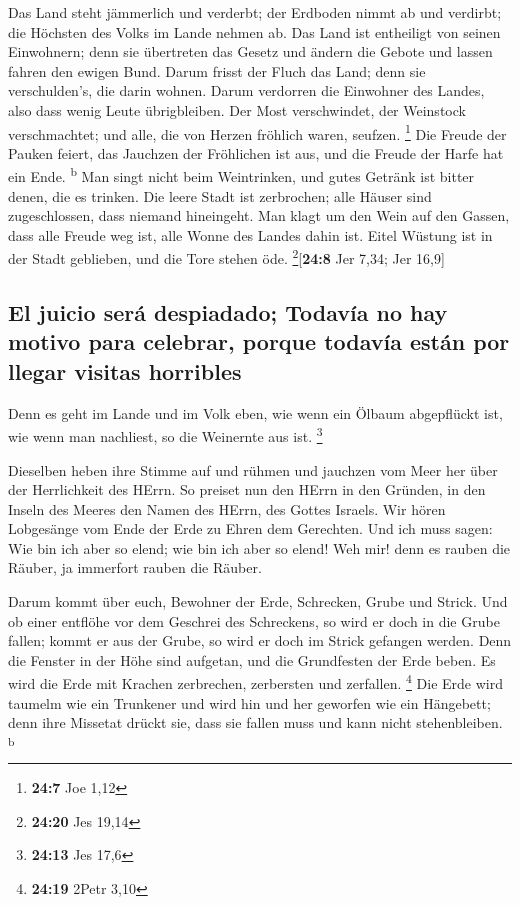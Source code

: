  Das Land steht jämmerlich und verderbt; der Erdboden
nimmt ab und verdirbt; die Höchsten des Volks im Lande nehmen ab.
 Das Land ist entheiligt von seinen Einwohnern; denn sie
übertreten das Gesetz und ändern die Gebote und lassen fahren den ewigen
Bund.  Darum frisst der Fluch das Land; denn sie
verschulden's, die darin wohnen. Darum verdorren die Einwohner des
Landes, also dass wenig Leute übrigbleiben.  Der Most
verschwindet, der Weinstock verschmachtet; und alle, die von Herzen
fröhlich waren, seufzen. \footnote{\textbf{24:7} Joe 1,12}
 Die Freude der Pauken feiert, das Jauchzen der Fröhlichen
ist aus, und die Freude der Harfe hat ein Ende. \textsuperscript{b}
 Man singt nicht beim Weintrinken, und gutes Getränk ist
bitter denen, die es trinken.  Die leere Stadt ist
zerbrochen; alle Häuser sind zugeschlossen, dass niemand hineingeht.
 Man klagt um den Wein auf den Gassen, dass alle Freude
weg ist, alle Wonne des Landes dahin ist.  Eitel Wüstung
ist in der Stadt geblieben, und die Tore stehen öde.
\footnote{\textbf{24:20} Jes 19,14}{[}\textbf{24:8} Jer 7,34; Jer
16,9{]}

\hypertarget{el-juicio-seruxe1-despiadado-todavuxeda-no-hay-motivo-para-celebrar-porque-todavuxeda-estuxe1n-por-llegar-visitas-horribles}{%
\subsection{El juicio será despiadado; Todavía no hay motivo para
celebrar, porque todavía están por llegar visitas
horribles}\label{el-juicio-seruxe1-despiadado-todavuxeda-no-hay-motivo-para-celebrar-porque-todavuxeda-estuxe1n-por-llegar-visitas-horribles}}

 Denn es geht im Lande und im Volk eben, wie wenn ein
Ölbaum abgepflückt ist, wie wenn man nachliest, so die Weinernte aus
ist. \footnote{\textbf{24:13} Jes 17,6}

 Dieselben heben ihre Stimme auf und rühmen und jauchzen
vom Meer her über der Herrlichkeit des HErrn.  So preiset
nun den HErrn in den Gründen, in den Inseln des Meeres den Namen des
HErrn, des Gottes Israels.  Wir hören Lobgesänge vom Ende
der Erde zu Ehren dem Gerechten. Und ich muss sagen: Wie bin ich aber so
elend; wie bin ich aber so elend! Weh mir! denn es rauben die Räuber, ja
immerfort rauben die Räuber.

 Darum kommt über euch, Bewohner der Erde, Schrecken,
Grube und Strick.  Und ob einer entflöhe vor dem Geschrei
des Schreckens, so wird er doch in die Grube fallen; kommt er aus der
Grube, so wird er doch im Strick gefangen werden. Denn die Fenster in
der Höhe sind aufgetan, und die Grundfesten der Erde beben.
 Es wird die Erde mit Krachen zerbrechen, zerbersten und
zerfallen. \footnote{\textbf{24:19} 2Petr 3,10}  Die Erde
wird taumelm wie ein Trunkener und wird hin und her geworfen wie ein
Hängebett; denn ihre Missetat drückt sie, dass sie fallen muss und kann
nicht stehenbleiben. \textsuperscript{b}

